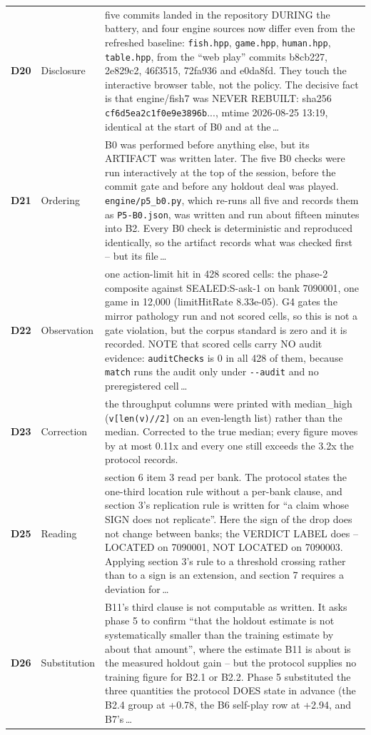 \begin{xltabular}{\linewidth}{@{}l l L@{}}
\textbf{D20} & Disclosure & five commits landed in the repository DURING the battery, and four engine sources now differ even from the refreshed baseline: \texttt{fish.hpp}, \texttt{game.hpp}, \texttt{human.hpp}, \texttt{table.hpp}, from the ``web play'' commits b8cb227, 2e829c2, 46f3515, 72fa936 and e0da8fd. They touch the interactive browser table, not the policy. The decisive fact is that engine/fish7 was NEVER REBUILT: sha256 \texttt{cf6d5ea2c1f0e9e3896b}..., mtime 2026-08-25 13:19, identical at the start of B0 and at the\,\ldots \\
\textbf{D21} & Ordering & B0 was performed before anything else, but its ARTIFACT was written later. The five B0 checks were run interactively at the top of the session, before the commit gate and before any holdout deal was played. \texttt{engine/p5\_b0.py}, which re-runs all five and records them as \texttt{P5-B0.json}, was written and run about fifteen minutes into B2. Every B0 check is deterministic and reproduced identically, so the artifact records what was checked first -- but its file\,\ldots \\
\textbf{D22} & Observation & one action-limit hit in 428 scored cells: the phase-2 composite against SEALED:S-ask-1 on bank 7090001, one game in 12,000 (limitHitRate 8.33e-05). G4 gates the mirror pathology run and not scored cells, so this is not a gate violation, but the corpus standard is zero and it is recorded. NOTE that scored cells carry NO audit evidence: \texttt{auditChecks} is 0 in all 428 of them, because \texttt{match} runs the audit only under \texttt{-{}-audit} and no preregistered cell\,\ldots \\
\textbf{D23} & Correction & the throughput columns were printed with median\_high (\texttt{v[len(v)//2]} on an even-length list) rather than the median. Corrected to the true median; every figure moves by at most 0.11x and every one still exceeds the 3.2x the protocol records. \\
\textbf{D25} & Reading & section 6 item 3 read per bank. The protocol states the one-third location rule without a per-bank clause, and section 3's replication rule is written for ``a claim whose SIGN does not replicate''. Here the sign of the drop does not change between banks; the VERDICT LABEL does -- LOCATED on 7090001, NOT LOCATED on 7090003. Applying section 3's rule to a threshold crossing rather than to a sign is an extension, and section 7 requires a deviation for\,\ldots \\
\textbf{D26} & Substitution & B11's third clause is not computable as written. It asks phase 5 to confirm ``that the holdout estimate is not systematically smaller than the training estimate by about that amount'', where the estimate B11 is about is the measured holdout gain -- but the protocol supplies no training figure for B2.1 or B2.2. Phase 5 substituted the three quantities the protocol DOES state in advance (the B2.4 group at +0.78, the B6 self-play row at +2.94, and B7's\,\ldots \\

\end{xltabular}
